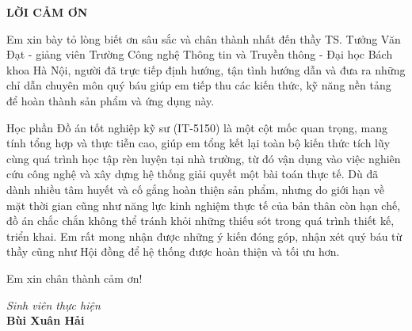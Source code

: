 \documentclass[../Project.tex]{subfiles}
\begin{document}
\begin{center}
    \Large{\textbf{LỜI CẢM ƠN}}\\
\end{center}
\vspace{1cm}

Em xin bày tỏ lòng biết ơn sâu sắc và chân thành nhất đến thầy TS. Tưởng Văn Đạt - giảng viên Trường Công nghệ Thông tin và Truyền thông - Đại học Bách khoa Hà Nội, người đã trực tiếp định hướng, tận tình hướng dẫn và đưa ra những chỉ dẫn chuyên môn quý báu giúp em tiếp thu các kiến thức, kỹ năng nền tảng để hoàn thành sản phẩm và ứng dụng này.

Học phần Đồ án tốt nghiệp kỹ sư (IT-5150) là một cột mốc quan trọng, mang tính tổng hợp và thực tiễn cao, giúp em tổng kết lại toàn bộ kiến thức tích lũy cùng quá trình học tập rèn luyện tại nhà trường, từ đó vận dụng vào việc nghiên cứu công nghệ và xây dựng hệ thống giải quyết một bài toán thực tế. Dù đã dành nhiều tâm huyết và cố gắng hoàn thiện sản phẩm, nhưng do giới hạn về mặt thời gian cũng như năng lực kinh nghiệm thực tế của bản thân còn hạn chế, đồ án chắc chắn không thể tránh khỏi những thiếu sót trong quá trình thiết kế, triển khai. Em rất mong nhận được những ý kiến đóng góp, nhận xét quý báu từ thầy cũng như Hội đồng để hệ thống được hoàn thiện và tối ưu hơn.

Em xin chân thành cảm ơn!

\begin{flushright}
    \textit{Sinh viên thực hiện}\\
    \textbf{Bùi Xuân Hải}
\end{flushright}
\end{document}
